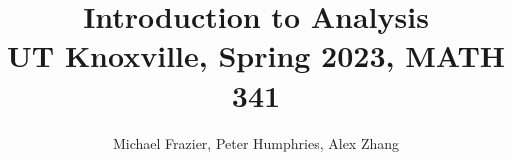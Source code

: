 \documentclass[math]{amznotes}
\title{\textbf{Introduction to Analysis}\\
\large UT Knoxville, Spring 2023, MATH 341}
\author{Michael Frazier, Peter Humphries, Alex Zhang}
\begin{document}
\maketitle
\tableofcontents






% 
% 









\amzindex
\end{document}
